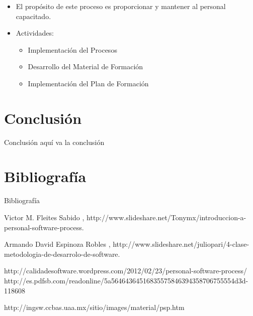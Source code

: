 \documentclass{beamer}
\begin{document}
			\begin{frame}
				\begin{itemize}
					\item El propósito de este proceso es proporcionar y mantener al personal capacitado.
					\item Actividades:
					\begin{itemize}
						\item Implementación del Procesos
						\item Desarrollo del Material de Formación
						\item Implementación del Plan de Formación 
					\end{itemize} 
				\end{itemize}
			\end{frame}
			
			
			
\section{Conclusi\'on}
	\begin{frame}{Conclusión}
		aqu\'i va la conclusi\'on
	\end{frame}				
			
\section{Bibliograf\'ia}
	\begin{frame}{Bibliograf\'ia}
		\begin{thebibliography}{9}
		
 			Victor M. Fleites Sabido 
 			, 
 			\newblock http://www.slideshare.net/Tonymx/introduccion-a-personal-software-process.
		
 			Armando David Espinoza Robles
 			, 
 			\newblock http://www.slideshare.net/juliopari/4-clase-metodologia-de-desarrolo-de-software.
 			
		http://calidadesoftware.wordpress.com/2012/02/23/personal-software-process/ 			
		http://es.pdfsb.com/readonline/5a56464364516835575846394358706755554d3d-118608
 			
 		http://ingsw.ccbas.uaa.mx/sitio/images/material/psp.htm
		\end{thebibliography}
	\end{frame}
\end{document}
